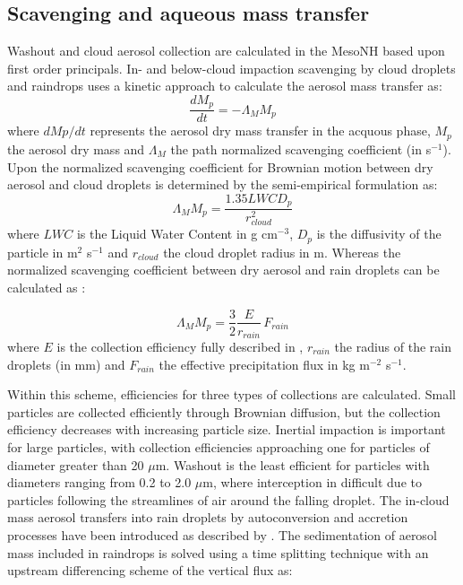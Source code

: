 \subsection{Scavenging and aqueous mass transfer}
Washout and cloud aerosol collection are calculated in the MesoNH based upon first order principals.  In- and below-cloud impaction scavenging by cloud droplets and raindrops uses a kinetic approach to calculate the aerosol mass transfer as:
\begin{equation}
\frac{dM_p}{dt}= - \Lambda_M M_p
\label{eq:scav}
\end{equation}  
where 
$dMp/dt$ represents the aerosol dry mass transfer in the acquous phase, $M_p$ the aerosol dry mass and $\Lambda_M$ the path normalized scavenging coefficient (in s$^{-1}$).
Upon \citet{Pruppacher2000} the normalized scavenging coefficient for Brownian motion between dry aerosol and cloud droplets is determined by the semi-empirical formulation as:
\begin{equation}
\Lambda_M M_p  = \frac{1.35 LWC D_p}{r^2_{cloud}}
\label{eq:cloud}
\end{equation}  
where $LWC$ is the Liquid Water Content in g cm$^{-3}$, $D_p$ is the diffusivity of the particle in m$^2$ s$^{-1}$ and $r_{cloud}$ the
cloud droplet radius in m.
Whereas the normalized scavenging coefficient between dry aerosol and rain droplets can be calculated as \citet{Seinfeld1997}:

\begin{equation}
\Lambda_M M_p  = \frac{3}{2} \frac{E}{r_{rain}} \, F_{rain}
\label{eq:rain}
\end{equation} 
where $E$ is the collection efficiency fully described in \citep{Seinfeld1997,Tost2006}, $r_{rain}$ the radius of the rain droplets (in mm) and $F_{rain}$ the effective precipitation flux in kg m$^{-2}$ s$^{-1}$.

Within this scheme, efficiencies for three types of collections are calculated.  Small particles are collected efficiently through Brownian diffusion, but the collection efficiency decreases with increasing particle size.  Inertial impaction is important for large particles, with collection efficiencies approaching one for particles of diameter greater than 20 $\mu$m.  Washout is the least efficient for particles with diameters ranging from 0.2 to 2.0 $\mu$m, where interception in difficult due to particles following the streamlines of air around the falling droplet.  
The in-cloud mass aerosol transfers into rain droplets by autoconversion and accretion processes have been introduced as described by \citet{Pinty1998}. The sedimentation of aerosol mass included in raindrops is solved using a time splitting technique with an upstream differencing scheme of the vertical flux as:

